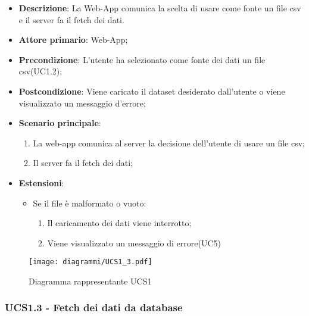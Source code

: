 \begin{itemize}

	\item \textbf{Descrizione}: La Web-App comunica la scelta di usare come fonte un file csv e il server fa il fetch dei dati.
	
    \item \textbf{Attore primario}: Web-App;
	        
    \item \textbf{Precondizione}:   L'utente ha selezionato come fonte dei dati un file csv(UC1.2);

    \item \textbf{Postcondizione}:  Viene caricato il dataset desiderato dall'utente o viene visualizzato un messaggio d'errore;

	\item \textbf{Scenario principale}:
		\begin{enumerate}
			\item La web-app comunica al server la decisione dell'utente di usare un file csv;
            \item Il server fa il fetch dei dati;
        \end{enumerate}
		
	\item \textbf{Estensioni}:
		\begin{itemize}
		
			\item Se il file è malformato o vuoto:
			\begin{enumerate}
				
				\item Il caricamento dei dati viene interrotto;
				\item Viene visualizzato un messaggio di errore(UC5)
				
			\end{enumerate}
		
		\end{itemize}
	
\end{itemize}

\begin{figure}[h]
    \centering
    \texttt{[image: diagrammi/UCS1\_3.pdf]}
    \caption{Diagramma rappresentante UCS1}
    \label{fig:UCS1_3}
\end{figure}

\subsubsection{UCS1.3 - Fetch dei dati da database}

